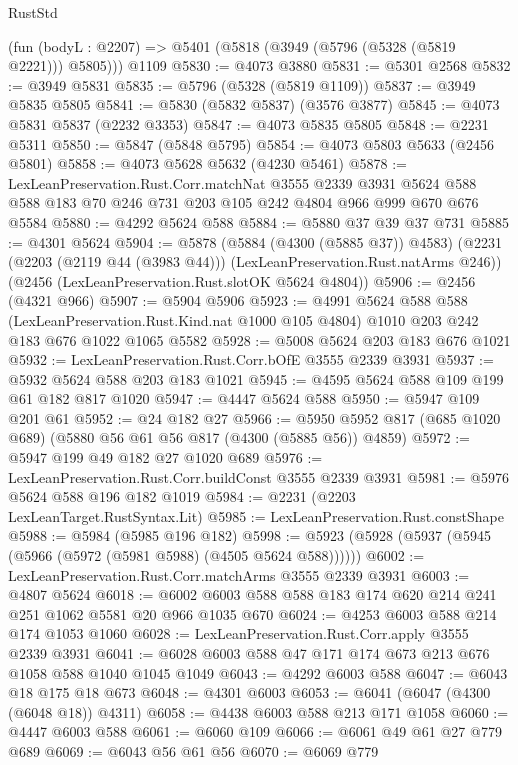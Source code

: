 \begin{lexlean}{RustStd}
\begin{coremodule}
    (fun (bodyL : @2207) => @5401 (@5818 (@3949 (@5796 (@5328 (@5819 @2221))) @5805)))
    @1109
@5830 := @4073 @3880
@5831 := @5301 @2568
@5832 := @3949 @5831
@5835 := @5796 (@5328 (@5819 @1109))
@5837 := @3949 @5835 @5805
@5841 := @5830 (@5832 @5837) (@3576 @3877)
@5845 := @4073 @5831 @5837 (@2232 @3353)
@5847 := @4073 @5835 @5805
@5848 := @2231 @5311
@5850 := @5847 (@5848 @5795)
@5854 := @4073 @5803 @5633 (@2456 @5801)
@5858 := @4073 @5628 @5632 (@4230 @5461)
@5878 := LexLeanPreservation.Rust.Corr.matchNat
    @3555
    @2339
    @3931
    @5624
    @588
    @588
    @183
    @70
    @246
    @731
    @203
    @105
    @242
    @4804
    @966
    @999
    @670
    @676
    @5584
@5880 := @4292 @5624 @588
@5884 := @5880 @37 @39 @37 @731
@5885 := @4301 @5624
@5904 := @5878
    (@5884 (@4300 (@5885 @37)) @4583)
    (@2231 (@2203 (@2119 @44 (@3983 @44))) (LexLeanPreservation.Rust.natArms @246))
    (@2456 (LexLeanPreservation.Rust.slotOK @5624 @4804))
@5906 := @2456 (@4321 @966)
@5907 := @5904 @5906
@5923 := @4991
    @5624
    @588
    @588
    (LexLeanPreservation.Rust.Kind.nat @1000 @105 @4804)
    @1010
    @203
    @242
    @183
    @676
    @1022
    @1065
    @5582
@5928 := @5008 @5624 @203 @183 @676 @1021
@5932 := LexLeanPreservation.Rust.Corr.bOfE @3555 @2339 @3931
@5937 := @5932 @5624 @588 @203 @183 @1021
@5945 := @4595 @5624 @588 @109 @199 @61 @182 @817 @1020
@5947 := @4447 @5624 @588
@5950 := @5947 @109 @201 @61
@5952 := @24 @182 @27
@5966 := @5950 @5952 @817 (@685 @1020 @689) (@5880 @56 @61 @56 @817 (@4300 (@5885 @56)) @4859)
@5972 := @5947 @199 @49 @182 @27 @1020 @689
@5976 := LexLeanPreservation.Rust.Corr.buildConst @3555 @2339 @3931
@5981 := @5976 @5624 @588 @196 @182 @1019
@5984 := @2231 (@2203 LexLeanTarget.RustSyntax.Lit)
@5985 := LexLeanPreservation.Rust.constShape
@5988 := @5984 (@5985 @196 @182)
@5998 := @5923 (@5928 (@5937 (@5945 (@5966 (@5972 (@5981 @5988) (@4505 @5624 @588))))))
@6002 := LexLeanPreservation.Rust.Corr.matchArms @3555 @2339 @3931
@6003 := @4807 @5624
@6018 := @6002 @6003 @588 @588 @183 @174 @620 @214 @241 @251 @1062 @5581 @20 @966 @1035 @670
@6024 := @4253 @6003 @588 @214 @174 @1053 @1060
@6028 := LexLeanPreservation.Rust.Corr.apply @3555 @2339 @3931
@6041 := @6028 @6003 @588 @47 @171 @174 @673 @213 @676 @1058 @588 @1040 @1045 @1049
@6043 := @4292 @6003 @588
@6047 := @6043 @18 @175 @18 @673
@6048 := @4301 @6003
@6053 := @6041 (@6047 (@4300 (@6048 @18)) @4311)
@6058 := @4438 @6003 @588 @213 @171 @1058
@6060 := @4447 @6003 @588
@6061 := @6060 @109
@6066 := @6061 @49 @61 @27 @779 @689
@6069 := @6043 @56 @61 @56
@6070 := @6069 @779

\end{coremodule}
\end{lexlean}
